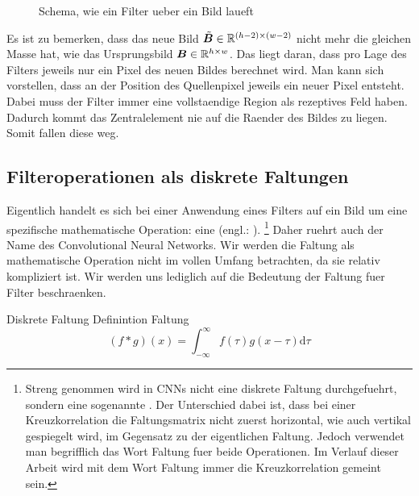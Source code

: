 \begin{figure}[h!]

  \caption{Schema, wie ein Filter ueber ein Bild laueft}
\end{figure}
\fi

Es ist zu bemerken, dass das neue Bild $\tilde{\bm{B}} \in \mathbb{R}^{(h-2) \times (w-2)}$ nicht mehr die gleichen Masse
hat, wie das Ursprungsbild $\bm{B} \in \mathbb{R}^{h \times w}$. Das liegt daran, dass pro
Lage des Filters jeweils nur ein Pixel des neuen Bildes berechnet wird. Man kann
sich vorstellen, dass an der Position des Quellenpixel jeweils ein neuer
Pixel entsteht. Dabei muss der Filter immer eine vollstaendige Region als
rezeptives Feld haben. Dadurch kommt das Zentralelement nie auf die Raender des
Bildes zu liegen. Somit fallen diese weg.
\para{}
\cite{deeplearning.ai:cnn}
\cite{wiki:convolution}

\subsection{Filteroperationen als diskrete Faltungen}
Eigentlich handelt es sich bei einer Anwendung eines Filters auf ein Bild um
eine spezifische mathematische Operation: eine  (engl.:
).
\footnote{
  Streng genommen wird in CNNs nicht eine diskrete Faltung durchgefuehrt, sondern
  eine sogenannte . Der Unterschied dabei ist, dass bei einer
  Kreuzkorrelation die Faltungsmatrix nicht zuerst horizontal, wie auch vertikal
  gespiegelt wird, im Gegensatz zu der eigentlichen Faltung. Jedoch verwendet man
  begrifflich das Wort Faltung fuer beide Operationen. Im Verlauf dieser Arbeit
  wird mit dem Wort Faltung immer die Kreuzkorrelation gemeint sein.
}
Daher ruehrt auch der Name des Convolutional Neural Networks.
Wir werden die Faltung als mathematische Operation nicht im vollen Umfang
betrachten, da sie relativ kompliziert ist. Wir werden uns lediglich auf die
Bedeutung der Faltung fuer Filter beschraenken.
\begin{defbox}{Diskrete Faltung}
  Definintion Faltung
  \begin{equation}
    (f * g)(x) = \int_{-\infty}^{\infty} f(\tau) g(x-\tau) \text{d}\tau
  \end{equation}
\end{defbox}

